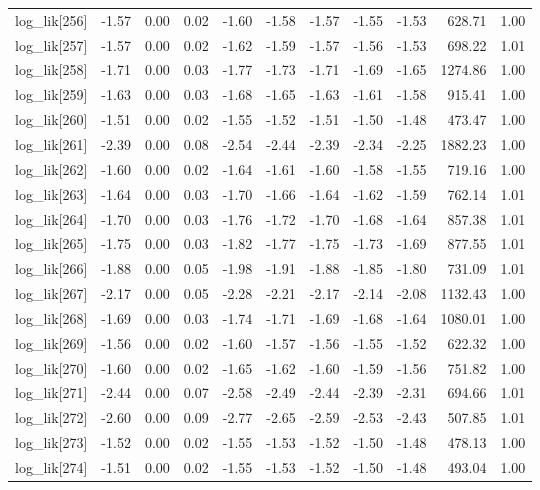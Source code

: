 \begin{table}[ht]
\begin{tabular}{rrrrrrrrrrr}
  log\_lik[256] & -1.57 & 0.00 & 0.02 & -1.60 & -1.58 & -1.57 & -1.55 & -1.53 & 628.71 & 1.00 \\ 
  log\_lik[257] & -1.57 & 0.00 & 0.02 & -1.62 & -1.59 & -1.57 & -1.56 & -1.53 & 698.22 & 1.01 \\ 
  log\_lik[258] & -1.71 & 0.00 & 0.03 & -1.77 & -1.73 & -1.71 & -1.69 & -1.65 & 1274.86 & 1.00 \\ 
  log\_lik[259] & -1.63 & 0.00 & 0.03 & -1.68 & -1.65 & -1.63 & -1.61 & -1.58 & 915.41 & 1.00 \\ 
  log\_lik[260] & -1.51 & 0.00 & 0.02 & -1.55 & -1.52 & -1.51 & -1.50 & -1.48 & 473.47 & 1.00 \\ 
  log\_lik[261] & -2.39 & 0.00 & 0.08 & -2.54 & -2.44 & -2.39 & -2.34 & -2.25 & 1882.23 & 1.00 \\ 
  log\_lik[262] & -1.60 & 0.00 & 0.02 & -1.64 & -1.61 & -1.60 & -1.58 & -1.55 & 719.16 & 1.00 \\ 
  log\_lik[263] & -1.64 & 0.00 & 0.03 & -1.70 & -1.66 & -1.64 & -1.62 & -1.59 & 762.14 & 1.01 \\ 
  log\_lik[264] & -1.70 & 0.00 & 0.03 & -1.76 & -1.72 & -1.70 & -1.68 & -1.64 & 857.38 & 1.01 \\ 
  log\_lik[265] & -1.75 & 0.00 & 0.03 & -1.82 & -1.77 & -1.75 & -1.73 & -1.69 & 877.55 & 1.01 \\ 
  log\_lik[266] & -1.88 & 0.00 & 0.05 & -1.98 & -1.91 & -1.88 & -1.85 & -1.80 & 731.09 & 1.01 \\ 
  log\_lik[267] & -2.17 & 0.00 & 0.05 & -2.28 & -2.21 & -2.17 & -2.14 & -2.08 & 1132.43 & 1.00 \\ 
  log\_lik[268] & -1.69 & 0.00 & 0.03 & -1.74 & -1.71 & -1.69 & -1.68 & -1.64 & 1080.01 & 1.00 \\ 
  log\_lik[269] & -1.56 & 0.00 & 0.02 & -1.60 & -1.57 & -1.56 & -1.55 & -1.52 & 622.32 & 1.00 \\ 
  log\_lik[270] & -1.60 & 0.00 & 0.02 & -1.65 & -1.62 & -1.60 & -1.59 & -1.56 & 751.82 & 1.00 \\ 
  log\_lik[271] & -2.44 & 0.00 & 0.07 & -2.58 & -2.49 & -2.44 & -2.39 & -2.31 & 694.66 & 1.01 \\ 
  log\_lik[272] & -2.60 & 0.00 & 0.09 & -2.77 & -2.65 & -2.59 & -2.53 & -2.43 & 507.85 & 1.01 \\ 
  log\_lik[273] & -1.52 & 0.00 & 0.02 & -1.55 & -1.53 & -1.52 & -1.50 & -1.48 & 478.13 & 1.00 \\ 
  log\_lik[274] & -1.51 & 0.00 & 0.02 & -1.55 & -1.53 & -1.52 & -1.50 & -1.48 & 493.04 & 1.00 \\ 

\end{tabular}
\end{table}
